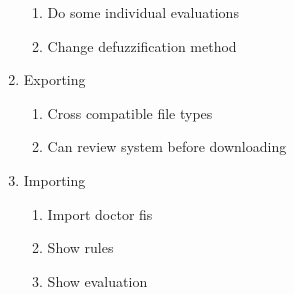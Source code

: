 \documentclass{article}
\begin{document}
\begin{enumerate}
\begin{enumerate}
	\item Do some individual evaluations
	\item Change defuzzification method
	\end{enumerate}
\item Exporting 
	\begin{enumerate}
	\item Cross compatible file types
	\item Can review system before downloading
	\end{enumerate}
\item Importing
	\begin{enumerate}
	\item Import doctor fis
	\item Show rules 
	\item Show evaluation
	\end{enumerate}
\end{enumerate}
\end{document}

